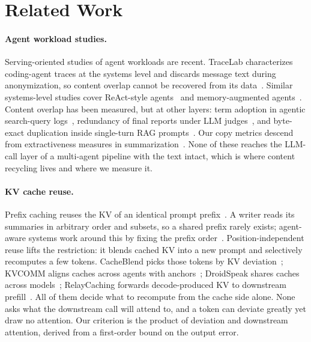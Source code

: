 \section{Related Work}
\label{sec:related-work}

\paragraph{Agent workload studies.}
Serving-oriented studies of agent workloads are recent. TraceLab characterizes coding-agent traces at the systems level and discards message text during anonymization, so content overlap cannot be recovered from its data~\citep{tracelab}. Similar systems-level studies cover ReAct-style agents~\citep{agentic-workload-char} and memory-augmented agents~\citep{agent-memory}. Content overlap has been measured, but at other layers: term adoption in agentic search-query logs~\citep{agentic-search-wild}, redundancy of final reports under LLM judges~\citep{reporteval}, and byte-exact duplication inside single-turn RAG prompts~\citep{byte-exact-dedup}. Our copy metrics descend from extractiveness measures in summarization~\citep{grusky2018,copy-paste-rag}. None of these reaches the LLM-call layer of a multi-agent pipeline with the text intact, which is where content recycling lives and where we measure it.

\paragraph{KV cache reuse.}
Prefix caching reuses the KV of an identical prompt prefix~\citep{radixattention}. A writer reads its summaries in arbitrary order and subsets, so a shared prefix rarely exists; agent-aware systems work around this by fixing the prefix order~\citep{plato}. Position-independent reuse lifts the restriction: it blends cached KV into a new prompt and selectively recomputes a few tokens. CacheBlend picks those tokens by KV deviation~\citep{cacheblend}; KVCOMM aligns caches across agents with anchors~\citep{kvcomm}; DroidSpeak shares caches across models~\citep{droidspeak}; RelayCaching forwards decode-produced KV to downstream prefill~\citep{relaycaching}. All of them decide what to recompute from the cache side alone. None asks what the downstream call will attend to, and a token can deviate greatly yet draw no attention. Our criterion is the product of deviation and downstream attention, derived from a first-order bound on the output error.

